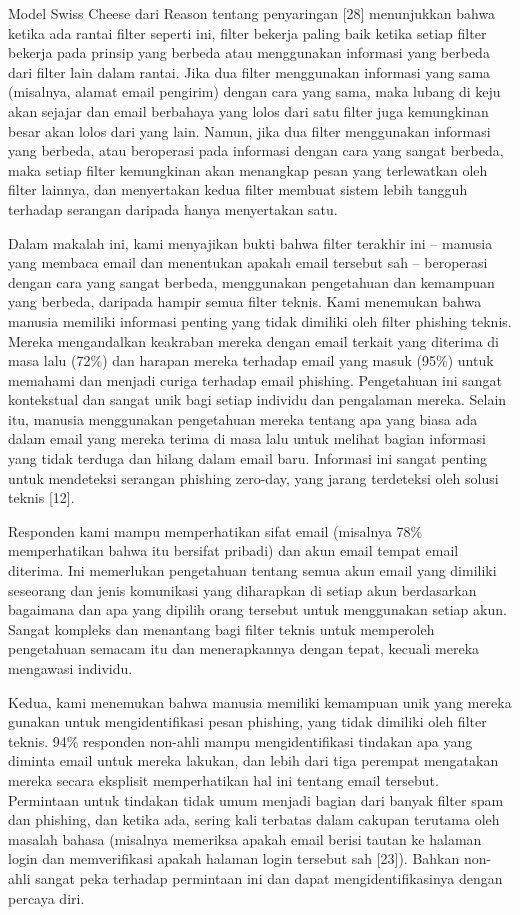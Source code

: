 \documentclass[lettersize,journal]{IEEEtran}
\begin{document}
Model Swiss Cheese dari Reason tentang penyaringan [28] menunjukkan bahwa
ketika ada rantai filter seperti ini, filter bekerja paling baik ketika setiap
filter bekerja pada prinsip yang berbeda atau menggunakan informasi yang
berbeda dari filter lain dalam rantai. Jika dua filter menggunakan informasi
yang sama (misalnya, alamat email pengirim) dengan cara yang sama, maka lubang
di keju akan sejajar dan email berbahaya yang lolos dari satu filter juga
kemungkinan besar akan lolos dari yang lain. Namun, jika dua filter menggunakan
informasi yang berbeda, atau beroperasi pada informasi dengan cara yang sangat
berbeda, maka setiap filter kemungkinan akan menangkap pesan yang terlewatkan
oleh filter lainnya, dan menyertakan kedua filter membuat sistem lebih tangguh
terhadap serangan daripada hanya menyertakan satu.

Dalam makalah ini, kami menyajikan bukti bahwa filter terakhir ini – manusia
yang membaca email dan menentukan apakah email tersebut sah – beroperasi dengan
cara yang sangat berbeda, menggunakan pengetahuan dan kemampuan yang berbeda,
daripada hampir semua filter teknis. Kami menemukan bahwa manusia memiliki
informasi penting yang tidak dimiliki oleh filter phishing teknis. Mereka
mengandalkan keakraban mereka dengan email terkait yang diterima di masa lalu
(72\%) dan harapan mereka terhadap email yang masuk (95\%) untuk memahami dan
menjadi curiga terhadap email phishing. Pengetahuan ini sangat kontekstual dan
sangat unik bagi setiap individu dan pengalaman mereka. Selain itu, manusia
menggunakan pengetahuan mereka tentang apa yang biasa ada dalam email yang
mereka terima di masa lalu untuk melihat bagian informasi yang tidak terduga
dan hilang dalam email baru. Informasi ini sangat penting untuk mendeteksi
serangan phishing zero-day, yang jarang terdeteksi oleh solusi teknis [12].

Responden kami mampu memperhatikan sifat email (misalnya 78\% memperhatikan
bahwa itu bersifat pribadi) dan akun email tempat email diterima. Ini
memerlukan pengetahuan tentang semua akun email yang dimiliki seseorang dan
jenis komunikasi yang diharapkan di setiap akun berdasarkan bagaimana dan apa
yang dipilih orang tersebut untuk menggunakan setiap akun. Sangat kompleks dan
menantang bagi filter teknis untuk memperoleh pengetahuan semacam itu dan
menerapkannya dengan tepat, kecuali mereka mengawasi individu.

Kedua, kami menemukan bahwa manusia memiliki kemampuan unik yang mereka gunakan
untuk mengidentifikasi pesan phishing, yang tidak dimiliki oleh filter teknis.
94\% responden non-ahli mampu mengidentifikasi tindakan apa yang diminta email
untuk mereka lakukan, dan lebih dari tiga perempat mengatakan mereka secara
eksplisit memperhatikan hal ini tentang email tersebut. Permintaan untuk
tindakan tidak umum menjadi bagian dari banyak filter spam dan phishing, dan
ketika ada, sering kali terbatas dalam cakupan terutama oleh masalah bahasa
(misalnya memeriksa apakah email berisi tautan ke halaman login dan
memverifikasi apakah halaman login tersebut sah [23]). Bahkan non-ahli sangat
peka terhadap permintaan ini dan dapat mengidentifikasinya dengan percaya diri.
\end{document}
